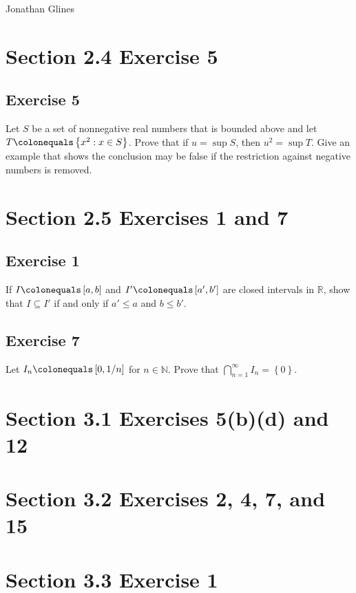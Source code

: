 \documentclass[12pt]{article}
\begin{document}
\begin{flushright}
\Large{Jonathan Glines}
\end{flushright}
\section*{Section 2.4 Exercise 5}

\subsection*{Exercise 5}
Let $S$ be a set of nonnegative real numbers that is bounded above and let $T \colonequals \left\{x^2 : x \in S\right\}$. Prove that if $u = \sup S$, then $u^2 = \sup T$. Give an example that shows the conclusion may be false if the restriction against negative numbers is removed.

\section*{Section 2.5 Exercises 1 and 7}

\subsection*{Exercise 1}
If $I \colonequals \left[a, b\right]$ and $I' \colonequals \left[a', b'\right]$ are closed intervals in $\mathbb{R}$, show that $I \subseteq I'$ if and only if $a' \leq a$ and $b \leq b'$.

\subsection*{Exercise 7}
Let $I_n \colonequals \left[0, 1/n\right]$ for $n \in \mathbb{N}$. Prove that $\bigcap_{n = 1}^\infty I_n = \left\{0\right\}$.

\section*{Section 3.1 Exercises 5(b)(d) and 12}
\section*{Section 3.2 Exercises 2, 4, 7, and 15}
\section*{Section 3.3 Exercise 1}
\end{document}

